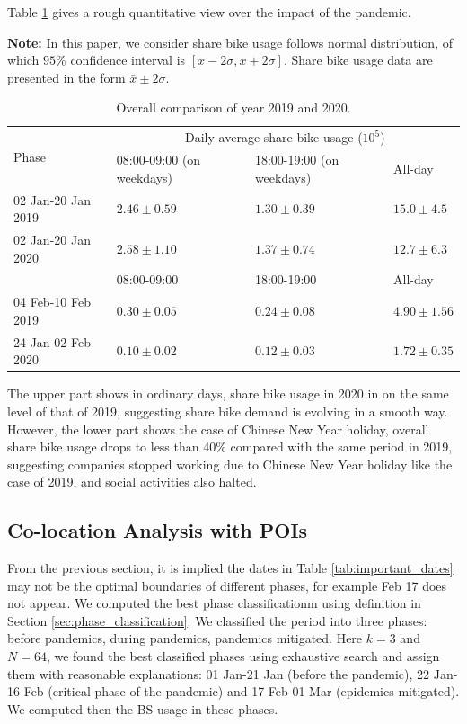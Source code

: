 \documentclass[preprints,ijgi,submit,moreauthors]{Definitions/mdpi}
\begin{document}
Table \ref{tab:overall_comparison} gives a rough quantitative view over the impact of the pandemic.

\textbf{Note:} In this paper, we consider share bike usage follows normal distribution, of which $95\%$ confidence interval is $[\bar{x}-2\sigma,\bar{x}+2\sigma]$.
Share bike usage data are presented in the form $\bar{x}\pm2\sigma$.

\begin{table}[ht]
    \centering
    \begin{tabular}{|l|l|l|l|}
        \hline
        \multirow{2}{*}{Phase} &\multicolumn{3}{c|}{Daily average share bike usage ($10^{5}$)}\\
        \cline{2-4}
        & 08:00-09:00 (on weekdays) & 18:00-19:00 (on weekdays) & All-day\\
        \hline
        02 Jan-20 Jan 2019 & $2.46\pm0.59$ & $1.30\pm0.39$ & $15.0\pm4.5$\\
        \hline
        02 Jan-20 Jan 2020 & $2.58\pm1.10$ & $1.37\pm0.74$ & $12.7\pm6.3$\\
        \hline
        \hline
        & 08:00-09:00 & 18:00-19:00 & All-day\\
        \hline
        04 Feb-10 Feb 2019 & $0.30\pm0.05$ & $0.24\pm0.08$ & $4.90\pm1.56$\\
        \hline
        24 Jan-02 Feb 2020 & $0.10\pm0.02$ & $0.12\pm0.03$ & $1.72\pm0.35$\\
        \hline
    \end{tabular}
    \caption{Overall comparison of year 2019 and 2020.}\label{tab:overall_comparison}
\end{table}

The upper part shows in ordinary days, share bike usage in 2020 in on the same level of that of 2019, suggesting share bike demand is evolving in a smooth way.
However, the lower part shows the case of Chinese New Year holiday, overall share bike usage drops to less than 40\% compared with the same period in 2019, suggesting companies stopped working due to Chinese New Year holiday like the case of 2019, and social activities also halted. 

\subsection{Co-location Analysis with POIs}\label{sec:colo-poi}

From the previous section, it is implied the dates in Table \ref{tab:important_dates} may not be the optimal boundaries of different phases, for example Feb 17 does not appear.
We computed the best phase classificationm using definition in Section \ref{sec:phase_classification}.
We classified the period into three phases: before pandemics, during pandemics, pandemics mitigated.
Here $k=3$ and $N=64$, we found the best classified phases using exhaustive search and assign them with reasonable explanations: 01 Jan-21 Jan (before the pandemic), 22 Jan-16 Feb (critical phase of the pandemic) and 17 Feb-01 Mar (epidemics mitigated).
We computed then the BS usage in these phases.
\end{document}
